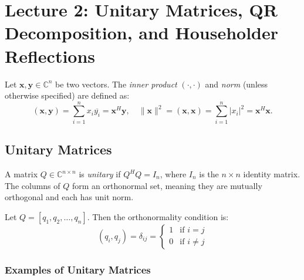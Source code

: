 \section{Lecture 2: Unitary Matrices, QR Decomposition, and Householder Reflections}

Let $\mathbf{x}, \mathbf{y} \in \mathbb{C}^n$ be two vectors. The \emph{inner product} $(\cdot, \cdot)$ and \emph{norm} (unless otherwise specified) are defined as:
\begin{equation}
    (\mathbf{x}, \mathbf{y}) = \sum_{i=1}^n x_i \overline{y_i} = \mathbf{x}^H \mathbf{y}, \quad \|\mathbf{x}\|^2 = (\mathbf{x}, \mathbf{x}) = \sum_{i=1}^n |x_i|^2 = \mathbf{x}^H \mathbf{x}.
\end{equation}

\subsection{Unitary Matrices}

A matrix $Q \in \mathbb{C}^{n \times n}$ is \emph{unitary} if $Q^H Q = I_n$, where $I_n$ is the $n \times n$ identity matrix. The columns of $Q$ form an orthonormal set, meaning they are mutually orthogonal and each has unit norm.

Let $Q = [q_1, q_2, \ldots, q_n]$. Then the orthonormality condition is:
\begin{equation}
    (q_i, q_j) = \delta_{ij} = \begin{cases}
        1 & \text{if } i = j    \\
        0 & \text{if } i \neq j
    \end{cases}
\end{equation}

\subsubsection{Examples of Unitary Matrices}

